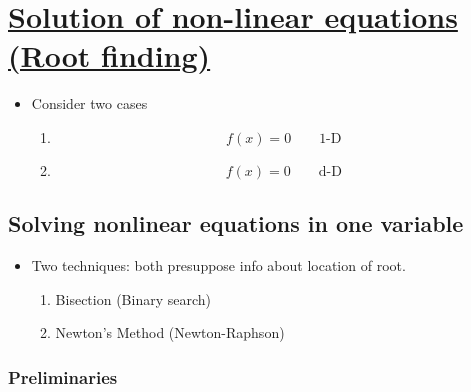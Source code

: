 \def \secname {Solution of non-linear equations (Root finding)}

\section[\secname]{\hyperlink{toc}{\secname}}

\begin{itemize}
    \item Consider two cases 
    \begin{enumerate}
        \item \[f(x) = 0 \qquad \text{1-D}\]
        \item \[ f(x) = 0 \qquad \text{d-D}\]
    \end{enumerate}
\end{itemize}

\subsection{ Solving nonlinear equations in one variable}

\begin{itemize}
    \item Two techniques: both presuppose info about location of root.

    \begin{enumerate}
        \item Bisection (Binary search)
        \item Newton's Method (Newton-Raphson)
    \end{enumerate}
\end{itemize}

\subsubsection{Preliminaries}

